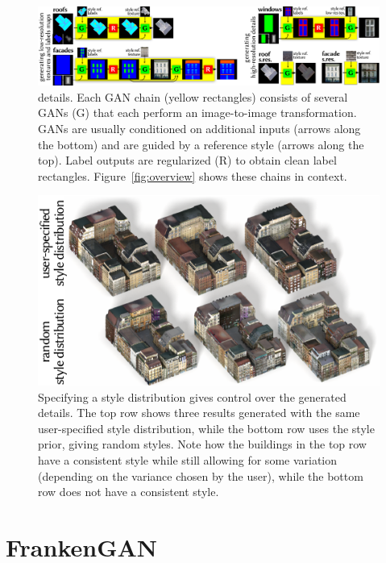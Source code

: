 \begin{figure}[t!]
    \centering
    \includegraphics[width=\textwidth]{images/franken_gan.pdf}
    \caption{\systemName details. Each GAN chain (yellow rectangles) consists of several GANs (G) that each perform an image-to-image transformation. GANs are usually conditioned on additional inputs (arrows along the bottom) and are guided by a reference style (arrows along the top). Label outputs are regularized (R) to obtain clean label rectangles. Figure~\ref{fig:overview} shows these chains in context.}
    \label{fig:franken_gan}
\end{figure}

\begin{figure}[b]
    \centering
    \includegraphics[width=\columnwidth]{images/specified_vs_random_style.pdf}
    \caption{Specifying a style distribution gives control over the generated details. The top row shows three results generated with the same user-specified style distribution, while the bottom row uses the style prior, giving random styles. Note how the buildings in the top row have a consistent style while still allowing for some variation (depending on the variance chosen by the user), while the bottom row does not have a consistent style.}
    \label{fig:specified_vs_random_style}
\end{figure}

\section{FrankenGAN}
\label{sec:franken_gan}

